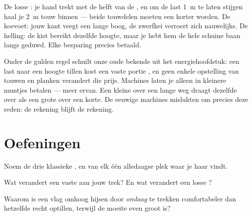\begin{example}\label{ex:g5:simple-machines:check}
De losse : je hand trekt met de helft van de , en om
de last \qty{1}{m} te laten stijgen haal je \qty{2}{m} touw binnen ---
beide touwdelen moeten een  korter worden. De koevoet: jouw kant
veegt een lange boog, de zwerfkei verroert zich nauwelijks. De
helling: de kist bereikt dezelfde hoogte, maar je hebt hem de hele
schuine baan langs geduwd. Elke besparing precies betaald.
\end{example}

\begin{remark}\label{rem:g5:simple-machines:whygolden}
Onder de gulden regel schuilt onze oude bekende uit het
energiehoofdstuk: een last naar een hoogte tillen kost een vaste
portie , en geen enkele opstelling van touwen en planken
verandert die prijs. Machines laten je alleen in kleinere muntjes
betalen --- meer ervan. Een kleine  over een lange weg draagt
dezelfde  over als een grote  over een korte. De
eeuwige machines mislukten om precies deze reden: de rekening blijft
de rekening.
\end{remark}

\section{Oefeningen}

\begin{exercise}[$\star$]\label{exo:g5:simple-machines:1}
Noem de drie klassieke , en van elk één alledaagse
plek waar je haar vindt.
\end{exercise}

\begin{exercise}[$\star$]\label{exo:g5:simple-machines:2}
Wat verandert een vaste  aan jouw trek? En wat verandert een
losse ?
\end{exercise}

\begin{exercise}[$\star$]\label{exo:g5:simple-machines:3}
Waarom is een vlag omhoog hijsen door \emph{omlaag} te trekken
comfortabeler dan hetzelfde  recht optillen, terwijl de moeite
even groot is?
\end{exercise}

